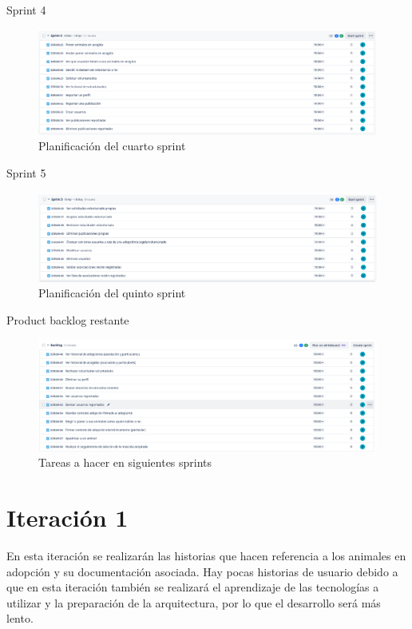 Sprint 4 \\
\begin{figure}[H]
	\centering
	\includegraphics[width=1\linewidth]{sprint4}
	\caption{Planificación del cuarto sprint}
	\label{fig:sprint4}
\end{figure}

Sprint 5 \\ 
\begin{figure}[H]
	\centering
	\includegraphics[width=1\linewidth]{sprint5}
	\caption{Planificación del quinto sprint}
	\label{fig:sprint5}
\end{figure}

Product backlog restante \\
\begin{figure}[H]
	\centering
	\includegraphics[width=1\linewidth]{pb}
	\caption{Tareas a hacer en siguientes sprints}
	\label{fig:pb_restante}
\end{figure}





\section{Iteración 1}

\large{En esta iteración se realizarán las historias que hacen referencia a los animales en adopción y su documentación asociada. Hay pocas historias de usuario debido a que en esta iteración también se realizará el aprendizaje de las tecnologías a utilizar y la preparación de la arquitectura, por lo que el desarrollo será más lento.}
 \\ 

